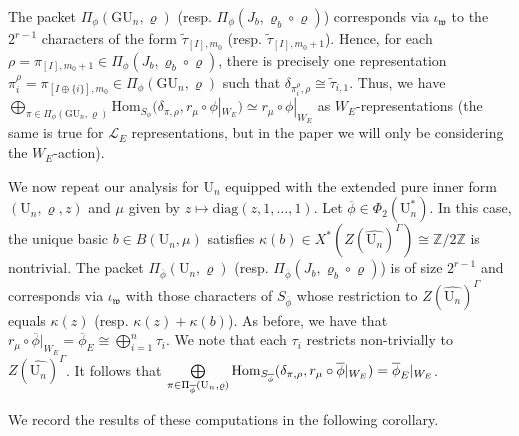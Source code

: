 \documentclass[reqno,11pt]{amsart}
\theoremstyle{remark}
\def\Hom{\mathop{\rm Hom}\nolimits}
\newcommand{\GU}{\mathrm{GU}}
\newcommand{\U}{\mathrm{U}}
\newcommand{\Z}{\mathbb{Z}}
\newcommand{\mc}{\mathcal}
\newcommand{\mf}{\mathfrak}
\newcommand{\diag}{\mathrm{diag}}
\newcommand{\ov}{\overline}
\newcommand{\ttau}{\tilde{\tau}}
\begin{document}
The packet $\Pi_{\phi}(\GU_n, \varrho)$ (resp. $\Pi_{\phi}(J_b, \varrho_b \circ \varrho)$) corresponds via $\iota_{\mf{w}}$ to the $2^{r-1}$ characters of the form $\ttau_{[I], m_0}$ (resp. $\ttau_{[I], m_0+1}$).  Hence, for each $\rho=\pi_{[I], m_0+1} \in \Pi_{\phi}(J_b, \varrho_b \circ \varrho)$, there is precisely one representation $\pi^{\rho}_i=\pi_{[I\oplus \{i\}],m_0}  \in \Pi_{\phi}(\GU_n, \varrho)$ such that $\delta_{\pi^{\rho}_i, \rho}  \cong \ttau_{i,1}$. Thus, we have $\bigoplus_{\pi \in \Pi_{\phi}(\GU_n, \varrho)} \mathrm{Hom}_{S_{\phi}}(\delta_{\pi,\rho},r_{\mu} \circ \phi|_{W_E}) \simeq  r_{\mu} \circ \phi|_{W_E}$ as $W_E$-representations (the same is true for $\mc{L}_E$ representations, but in the paper we will only be considering the $W_E$-action).

We now repeat our analysis for $\U_n$ equipped with the extended pure inner form $(\U_n, \varrho, z)$ and $\mu$ given by $z \mapsto \diag(z,1, \ldots, 1)$. Let $\ov{\phi} \in \Phi_2(\U^*_n)$. In this case, the unique basic $b \in B(\U_n, \mu)$ satisfies $\kappa(b) \in X^*(Z(\widehat{\U_n})^{\Gamma}) \cong \Z / 2 \Z$ is nontrivial. The packet $\Pi_{\ov{\phi}}(\U_n, \varrho)$ (resp. $\Pi_{\ov{\phi}}(J_b, \varrho_b \circ \varrho)$) is of size $2^{r-1}$ and corresponds via $\iota_{\mf{w}}$ with those characters of $S_{\ov{\phi}}$ whose restriction to $Z(\widehat{\U_n})^{\Gamma}$ equals $\kappa(z)$ (resp. $\kappa(z)+\kappa(b)$). As before, we have that $r_{\mu} \circ \ov{\phi}|_{W_E} = \ov{\phi}_E \cong \bigoplus\limits^n_{i=1} \tau_i$. We note that each $\tau_i$ restricts non-trivially to $Z(\widehat{\U_n})^{\Gamma}$. It follows that $\bigoplus\limits_{\pi \in \Pi_{\ov{\phi}}(\U_n, \varrho)}\Hom_{S_{\ov{\phi}}}(\delta_{\pi, \rho}, r_{\mu} \circ \ov{\phi}|_{W_E}) = \ov{\phi}_E|_{W_E}$.

We record the results of these computations in the following corollary.
\end{document}
